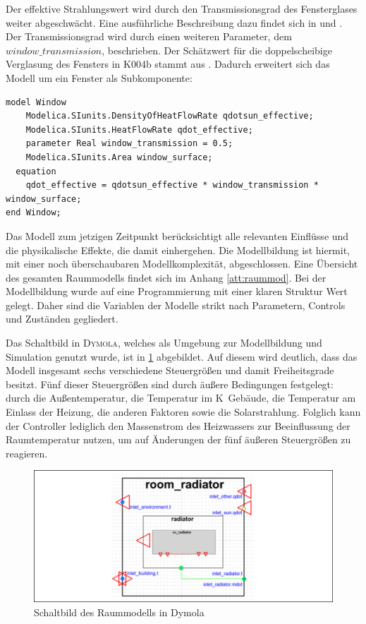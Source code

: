 Der effektive Strahlungswert wird durch den Transmissionsgrad des Fensterglases weiter abgeschwächt. Eine ausführliche Beschreibung dazu findet sich in \cite{ha13} und \cite{ka13}. Der Transmissionsgrad wird durch einen weiteren Parameter, dem $window\_transmission$, beschrieben. Der Schätzwert für die doppelscheibige Verglasung des Fensters in K004b stammt aus \cite[S.~63]{ha13}. Dadurch erweitert sich das Modell um ein Fenster als Subkomponente:

\begin{lstlisting}[language=Modelica, caption={Fenster als Subkomponente des Raummodells},label=lst:raumdrei]
model Window
	Modelica.SIunits.DensityOfHeatFlowRate qdotsun_effective;
	Modelica.SIunits.HeatFlowRate qdot_effective;
	parameter Real window_transmission = 0.5;
	Modelica.SIunits.Area window_surface;
  equation
  	qdot_effective = qdotsun_effective * window_transmission * window_surface;
end Window;
\end{lstlisting}

Das Modell zum jetzigen Zeitpunkt berücksichtigt alle relevanten Einflüsse und die physikalische Effekte, die damit einhergehen. Die Modellbildung ist hiermit, mit einer noch überschaubaren Modellkomplexität, abgeschlossen. Eine Übersicht des gesamten Raummodells findet sich im Anhang \ref{att:raummod}. Bei der Modellbildung wurde auf eine Programmierung mit einer klaren Struktur Wert gelegt. Daher sind die Variablen der Modelle strikt nach Parametern, Controls und Zuständen gegliedert.

Das Schaltbild in \textsc{Dymola}, welches als Umgebung zur Modellbildung und Simulation genutzt wurde, ist in \ref{fig:raumdym} abgebildet. Auf diesem wird deutlich, dass das Modell insgesamt sechs verschiedene Steuergrößen und damit Freiheitsgrade besitzt. Fünf dieser Steuergrößen sind durch äußere Bedingungen festgelegt: durch die Außentemperatur, die Temperatur im K~Gebäude, die Temperatur am Einlass der Heizung, die anderen Faktoren sowie die Solarstrahlung. Folglich kann der Controller lediglich den Massenstrom des Heizwassers zur Beeinflussung der Raumtemperatur nutzen, um auf Änderungen der fünf äußeren Steuergrößen zu reagieren. 

\begin{figure}
\centering
\includegraphics[width=\textwidth]{abbildungen/20160331_raumdym}
\caption{Schaltbild des Raummodells in Dymola}
\label{fig:raumdym}
\end{figure}

